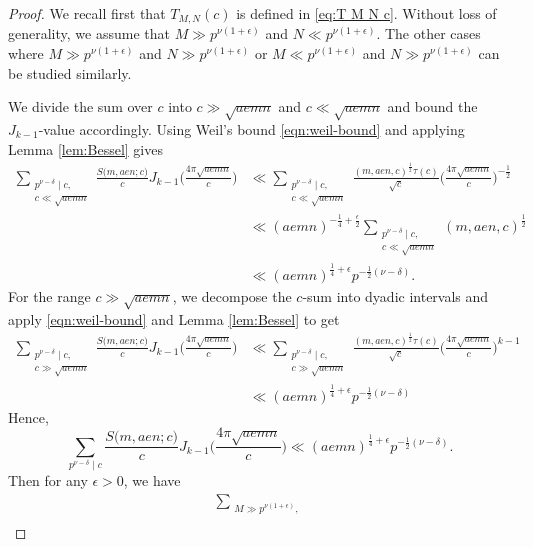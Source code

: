 \documentclass[12pt]{amsart}
\theoremstyle{plain}
\theoremstyle{definition}
\begin{document}
\begin{proof}
We recall first that $T_{M, N}(c) $ is defined in \eqref{eq:T M N c}.
Without loss of generality, we assume that 
$M\gg p^{\nu(1+\epsilon)}$ and $N\ll p^{\nu(1+\epsilon)}$. The other cases where $M\gg p^{\nu(1+\epsilon)}$ and  $N\gg p^{\nu(1+\epsilon)}$ or $M\ll p^{\nu(1+\epsilon)}$ and $N\gg p^{\nu(1+\epsilon)}$ can be studied similarly. 

We divide the sum over $c$ into $c \gg \sqrt{aemn}$ and $c \ll \sqrt{aemn}$ and bound the $J_{k-1}$-value accordingly. 
Using Weil's bound \eqref{eqn:weil-bound} and applying Lemma \ref{lem:Bessel} gives
    \begin{align*}
    \sum_{\substack{p^{\nu-\delta} \mid c, \\
    c \ll \sqrt{aemn}}} \frac{S\big(m, aen; c\big)}{c} 
    J_{k-1}\Big(\frac{4\pi\sqrt{aemn}}{c}\Big) 
    &\ll 
   \sum_{\substack{p^{\nu-\delta} \mid c, \\
    c \ll \sqrt{aemn}}}
    \frac{(m, aen, c)^{\frac12} \tau(c) }{\sqrt{c}}  
    \Big(\frac{4\pi\sqrt{aemn}}{c}\Big)^{-\frac12}
   \\& \ll
     (aemn)^{-\frac14+\frac{\epsilon}{2}}  
    \sum_{\substack{p^{\nu-\delta} \mid c, \\
    c \ll \sqrt{aemn}}}
    (m, aen, c)^{\frac12} \\&
    \ll(aemn)^{\frac14+\epsilon}p^{-\frac{1}{2}(\nu-\delta)}. 
    \end{align*}
For the range $c \gg \sqrt{aemn}$, we decompose the $c$-sum into dyadic intervals and apply  \eqref{eqn:weil-bound} and Lemma \ref{lem:Bessel} to get    \begin{align*}
    \sum_{\substack{p^{\nu-\delta} \mid c, \\
    c \gg \sqrt{aemn}}} \frac{S\big(m, aen; c\big)}{c} 
    J_{k-1}\Big(\frac{4\pi\sqrt{aemn}}{c}\Big) 
    & \ll
    \sum_{\substack{p^{\nu-\delta} \mid c, \\
    c \gg \sqrt{aemn}}} \frac{(m, aen, c)^{\frac12} \tau(c) }{\sqrt c} 
    \Big(\frac{4\pi\sqrt{aemn}}{c}\Big)^{k-1}
  \\&  \ll
    (aemn)^{\frac14+\epsilon}p^{-\frac{1}{2}(\nu-\delta)}
    \end{align*}
Hence,
    \[
    \sum_{p^{\nu-\delta} \mid c} \frac{S\big(m, aen; c\big)}{c} 
    J_{k-1}\Big(\frac{4\pi\sqrt{aemn}}{c}\Big) 
    \ll  (aemn)^{\frac14+\epsilon}p^{-\frac{1}{2}(\nu-\delta)}.
    \]
Then for any $\epsilon >0$, we have
    \begin{align*}
        \sum_{\substack{M \gg p^{\nu(1+\epsilon)},\\
}}
\end{align*}
\end{proof}
\end{document}
